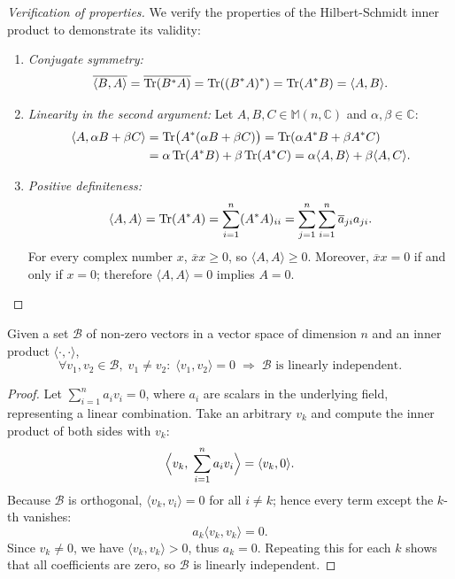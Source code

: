 \begin{proof}[Verification of properties]
We verify the properties of the Hilbert-Schmidt inner product to demonstrate its validity:
\begin{enumerate}
\item \textit{Conjugate symmetry:}
\begin{equation}
\overline{\langle B, A \rangle} = \overline{\operatorname{Tr}(B^*A)} = \operatorname{Tr}((B^*A)^*) = \operatorname{Tr}(A^*B) = \langle A, B \rangle
.\end{equation}

\item \textit{Linearity in the second argument:} Let $A, B, C \in \mathbb{M}(n, \mathbb{C})$ and $\alpha, \beta \in \mathbb{C}$:
\begin{align*}
\langle A, \alpha B + \beta C \rangle &= \operatorname{Tr}\bigl(A^*(\alpha B + \beta C)\bigr)
= \operatorname{Tr}(\alpha A^*B + \beta A^*C) \\
&= \alpha \operatorname{Tr}(A^*B) + \beta \operatorname{Tr}(A^*C)
= \alpha\langle A, B \rangle + \beta\langle A, C \rangle
.\end{align*}

\item \textit{Positive definiteness:}
\begin{equation}
\langle A, A \rangle = \operatorname{Tr}(A^*A) = \sum_{i=1}^n (A^*A)_{ii} = \sum_{j=1}^n\sum_{i=1}^n \overline{a}_{ji}a_{ji}
.\end{equation}
For every complex number $x$, $\overline{x}x \ge 0$, so $\langle A, A \rangle \ge 0$. Moreover, $\overline{x}x = 0$ if and only if $x = 0$; therefore $\langle A, A \rangle = 0$ implies $A = 0$.
\end{enumerate}
\end{proof}

\begin{theorem}
\label{thm:orthogonality_to_linear_independence}
Given a set $\mathcal{B}$ of non-zero vectors in a vector space of dimension $n$ and an inner product $\langle\cdot,\cdot\rangle$,
\begin{equation}
\forall v_1,v_2\in\mathcal{B},\; v_1\neq v_2:\; \langle v_1,v_2\rangle = 0 \;\Longrightarrow\; \mathcal{B} \text{ is linearly independent}
.\end{equation}
\begin{proof}
Let $\sum_{i=1}^n a_i v_i = 0$, where $a_i$ are scalars in the underlying field, representing a linear combination. Take an arbitrary $v_k$ and compute the inner product of both sides with $v_k$:
\begin{equation}
\Bigl\langle v_k,\;\sum_{i=1}^n a_i v_i\Bigr\rangle = \langle v_k,0\rangle
.\end{equation}
Because $\mathcal{B}$ is orthogonal, $\langle v_k,v_i\rangle = 0$ for all $i\neq k$; hence every term except the $k$-th vanishes:
\begin{equation}
a_k \langle v_k,v_k\rangle = 0
.\end{equation}
Since $v_k \neq 0$, we have $\langle v_k,v_k\rangle > 0$, thus $a_k = 0$. Repeating this for each $k$ shows that all coefficients are zero, so $\mathcal{B}$ is linearly independent.
\end{proof}
\end{theorem}

